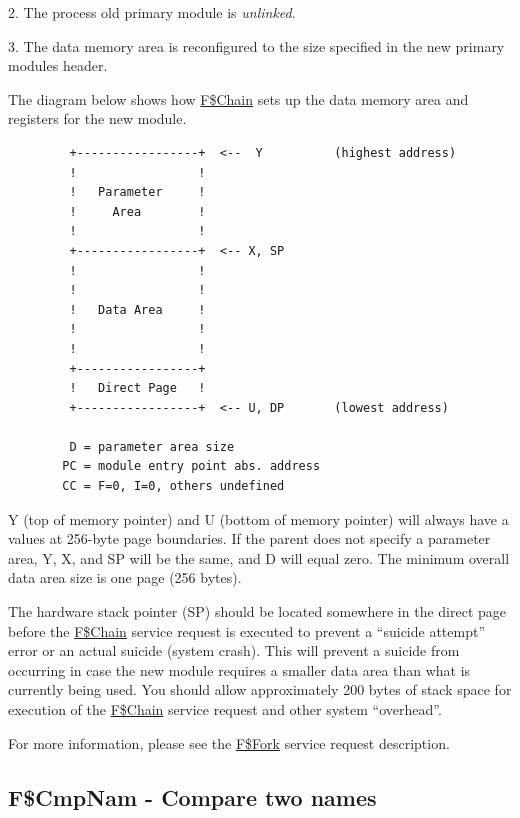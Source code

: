 \documentclass[
]{article}
\begin{document}
2. The process\textquotesingle{} old primary module is \emph{unlinked}.

3. The data memory area is reconfigured to the size specified in the new
primary module\textquotesingle s header.

The diagram below shows how \hyperref[f.chain]{F\$Chain} sets up the
data memory area and registers for the new module.

\begin{figure}
\centering
\begin{verbatim}
   +-----------------+  <--  Y          (highest address)
   !                 !
   !   Parameter     !
   !     Area        !
   !                 !
   +-----------------+  <-- X, SP
   !                 !
   !                 !
   !   Data Area     !
   !                 !
   !                 !
   +-----------------+
   !   Direct Page   !
   +-----------------+  <-- U, DP       (lowest address)

   D = parameter area size
  PC = module entry point abs. address
  CC = F=0, I=0, others undefined
\end{verbatim}
\caption{}
\end{figure}

Y (top of memory pointer) and U (bottom of memory pointer) will always
have a values at 256-byte page boundaries. If the parent does not
specify a parameter area, Y, X, and SP will be the same, and D will
equal zero. The minimum overall data area size is one page (256 bytes).

The hardware stack pointer (SP) should be located somewhere in the
direct page before the \hyperref[f.chain]{F\$Chain} service request is
executed to prevent a ``suicide attempt'' error or an actual suicide
(system crash). This will prevent a suicide from occurring in case the
new module requires a smaller data area than what is currently being
used. You should allow approximately 200 bytes of stack space for
execution of the \hyperref[f.chain]{F\$Chain} service request and other
system ``overhead''.

For more information, please see the \hyperref[f.fork]{F\$Fork} service
request description.

\subsection{F\$CmpNam - Compare two names}
\end{document}

